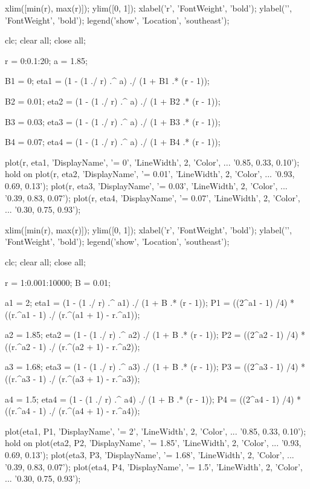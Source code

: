 \begin{verbatim*}
xlim([min(r), max(r)]);
ylim([0, 1]);
xlabel('r', 'FontWeight', 'bold');
ylabel('\eta', 'FontWeight', 'bold');
legend('show', 'Location', 'southeast');

clc; clear all; close all;

r = 0:0.1:20;
a = 1.85;

B1 = 0;
eta1 = (1 - (1 ./ r) .^ a) ./ (1 + B1 .* (r - 1));

B2 = 0.01;
eta2 = (1 - (1 ./ r) .^ a) ./ (1 + B2 .* (r - 1));

B3 = 0.03;
eta3 = (1 - (1 ./ r) .^ a) ./ (1 + B3 .* (r - 1));

B4 = 0.07;
eta4 = (1 - (1 ./ r) .^ a) ./ (1 + B4 .* (r - 1));

plot(r, eta1, 'DisplayName', '\beta = 0', 'LineWidth', 2, 'Color', ...
    '0.85, 0.33, 0.10');
hold on
plot(r, eta2, 'DisplayName', '\beta = 0.01', 'LineWidth', 2, 'Color', ...
    '0.93, 0.69, 0.13');
plot(r, eta3, 'DisplayName', '\beta = 0.03', 'LineWidth', 2, 'Color', ...
    '0.39, 0.83, 0.07');
plot(r, eta4, 'DisplayName', '\beta = 0.07', 'LineWidth', 2, 'Color', ...
    '0.30, 0.75, 0.93');

xlim([min(r), max(r)]);
ylim([0, 1]);
xlabel('r', 'FontWeight', 'bold');
ylabel('\eta', 'FontWeight', 'bold');
legend('show', 'Location', 'southeast');

clc; clear all; close all;

r = 1:0.001:10000;
B = 0.01;

a1 = 2;
eta1 = (1 - (1 ./ r) .^ a1) ./ (1 + B .* (r - 1));
P1 = ((2^a1 - 1) /4) * ((r.^a1 - 1) ./ (r.^(a1 + 1) - r.^a1));

a2 = 1.85;
eta2 = (1 - (1 ./ r) .^ a2) ./ (1 + B .* (r - 1));
P2 = ((2^a2 - 1) /4) * ((r.^a2 - 1) ./ (r.^(a2 + 1) - r.^a2));

a3 = 1.68;
eta3 = (1 - (1 ./ r) .^ a3) ./ (1 + B .* (r - 1));
P3 = ((2^a3 - 1) /4) * ((r.^a3 - 1) ./ (r.^(a3 + 1) - r.^a3));

a4 = 1.5;
eta4 = (1 - (1 ./ r) .^ a4) ./ (1 + B .* (r - 1));
P4 = ((2^a4 - 1) /4) * ((r.^a4 - 1) ./ (r.^(a4 + 1) - r.^a4));

plot(eta1, P1, 'DisplayName', '\alpha = 2', 'LineWidth', 2, 'Color', ...
    '0.85, 0.33, 0.10');
hold on
plot(eta2, P2, 'DisplayName', '\alpha = 1.85', 'LineWidth', 2, 'Color', ...
    '0.93, 0.69, 0.13');
plot(eta3, P3, 'DisplayName', '\alpha = 1.68', 'LineWidth', 2, 'Color', ...
    '0.39, 0.83, 0.07');
plot(eta4, P4, 'DisplayName', '\alpha = 1.5', 'LineWidth', 2, 'Color', ...
    '0.30, 0.75, 0.93');


\end{verbatim*}
